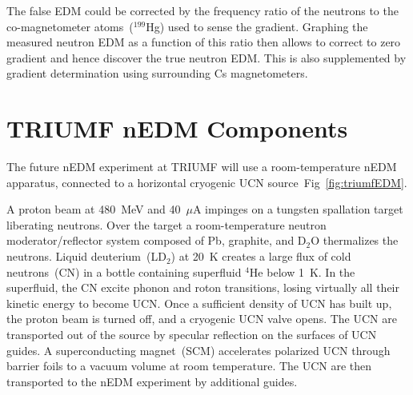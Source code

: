 The false EDM could be corrected by the frequency ratio of the
neutrons to the co-magnetometer atoms~($^{199}$Hg) used to sense the
gradient. Graphing the measured neutron EDM as a function of this
ratio then allows to correct to zero gradient and hence discover the
true neutron EDM. This is also supplemented by gradient determination
using surrounding Cs magnetometers.





\section{TRIUMF nEDM Components}
The future nEDM experiment at TRIUMF will use a room-temperature nEDM
apparatus, connected to a horizontal cryogenic UCN
source~Fig~\ref{fig:triumfEDM}.

A proton beam at 480~MeV and 40~$\mu$A impinges on a tungsten
spallation target liberating neutrons. Over the target a
room-temperature neutron moderator/reflector system composed of Pb,
graphite, and D$_2$O thermalizes the neutrons. Liquid
deuterium~(LD$_2$) at 20~K creates a large flux of cold neutrons~(CN)
in a bottle containing superfluid $^4$He below 1~K. In the superfluid,
the CN excite phonon and roton transitions, losing virtually all their
kinetic energy to become UCN. Once a sufficient density of UCN has
built up, the proton beam is turned off, and a cryogenic UCN valve
opens. The UCN are transported out of the source by specular
reflection on the surfaces of UCN guides. A superconducting
magnet~(SCM) accelerates polarized UCN through barrier foils to a
vacuum volume at room temperature. The UCN are then transported to the
nEDM experiment by additional guides.

